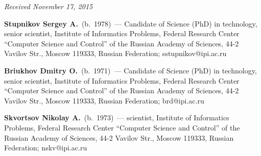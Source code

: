 \vspace*{-6pt}

\hfill{\small\textit{Received November 17, 2015}}

\vspace*{-12pt}
      
      \Contr
      
      
       \noindent
       \textbf{Stupnikov Sergey A.}\ (b.\ 1978)~--- Candidate of Science (PhD) in technology, 
senior scientist, Institute of Informatics Problems, Federal Research Center ``Computer Science and 
Control'' of the Russian Academy of Sciences, 44-2 Vavilov Str., Moscow 119333, Russian 
Federation; sstupnikov@ipi.ac.ru
       
       \vspace*{3pt}
       
       \noindent
       \textbf{Briukhov Dmitry O.}\ (b.\ 1971)~--- Candidate of Science (PhD) in technology, 
senior scientist, Institute of Informatics Problems, Federal Research Center ``Computer Science and 
Control'' of the Russian Academy of Sciences, 44-2 Vavilov Str., Moscow 119333, Russian Federation; 
brd@ipi.ac.ru 
       
       \vspace*{3pt}
       
       \noindent
       \textbf{Skvortsov Nikolay A.}\ (b.\ 1973)~---
       scientist, Institute of Informatics Problems, Federal Research Center ``Computer Science 
and Control'' of the Russian Academy of Sciences, 44-2 Vavilov Str., Moscow 119333, Russian 
Federation; nskv@ipi.ac.ru 
      
\label{end\stat}


\renewcommand{\bibname}{\protect\rm Литература}